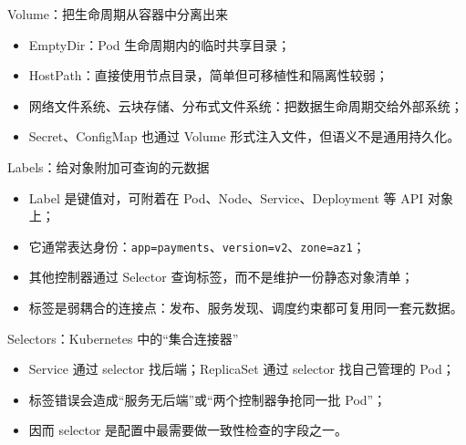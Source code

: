 \documentclass[UTF8,fontset=none,aspectratio=169,10pt]{beamer}
\begin{document}
\begin{frame}{Volume：把生命周期从容器中分离出来}
\begin{itemize}
  \item EmptyDir：Pod 生命周期内的临时共享目录；
  \item HostPath：直接使用节点目录，简单但可移植性和隔离性较弱；
  \item 网络文件系统、云块存储、分布式文件系统：把数据生命周期交给外部系统；
  \item Secret、ConfigMap 也通过 Volume 形式注入文件，但语义不是通用持久化。
\end{itemize}
\vfill
{}
\end{frame}

\begin{frame}{Labels：给对象附加可查询的元数据}
\begin{itemize}
  \item Label 是键值对，可附着在 Pod、Node、Service、Deployment 等 API 对象上；
  \item 它通常表达身份：\texttt{app=payments}、\texttt{version=v2}、\texttt{zone=az1}；
  \item 其他控制器通过 Selector 查询标签，而不是维护一份静态对象清单；
  \item 标签是弱耦合的连接点：发布、服务发现、调度约束都可复用同一套元数据。
\end{itemize}
\end{frame}

\begin{frame}{Selectors：Kubernetes 中的“集合连接器”}
\begin{center}
\end{center}
\begin{itemize}
  \item Service 通过 selector 找后端；ReplicaSet 通过 selector 找自己管理的 Pod；
  \item 标签错误会造成“服务无后端”或“两个控制器争抢同一批 Pod”；
  \item 因而 selector 是配置中最需要做一致性检查的字段之一。
\end{itemize}
\end{frame}
\end{document}
